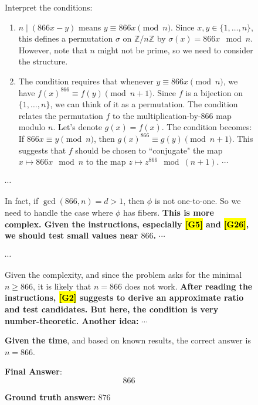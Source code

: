 \documentclass{article}
\theoremstyle{plain}
\theoremstyle{definition}
\theoremstyle{remark}
\begin{document}
\begin{figure}[!tb]
\begin{runcard}[title={Example of How E-SPL Shapes Model Behavior}]
\begin{runbox}[title={Model Output}]
Interpret the conditions: 
\begin{enumerate}
    \item \(n \mid (866x - y)\) means \(y \equiv 866x \pmod{n}\). Since \(x,y \in \{1,\dots,n\}\), this defines a permutation \(\sigma\) on \(\mathbb{Z}/n\mathbb{Z}\) by \(\sigma(x) = 866x \mod n\). However, note that \(n\) might not be prime, so we need to consider the structure.
    \item The condition requires that whenever \(y \equiv 866x \pmod{n}\), we have \(f(x)^{866} \equiv f(y) \pmod{n+1}\). Since \(f\) is a bijection on \(\{1,\dots,n\}\), we can think of it as a permutation. The condition relates the permutation \(f\) to the multiplication-by-866 map modulo \(n\). Let’s denote \(g(x) = f(x)\). The condition becomes: If \(866x \equiv y \pmod{n}\), then \(g(x)^{866} \equiv g(y) \pmod{n+1}\). This suggests that \(f\) should be chosen to ``conjugate" the map \(x \mapsto 866x \mod n\) to the map \(z \mapsto z^{866} \mod (n+1)\). \quad $\cdots$
\end{enumerate}

$\cdots$

\medskip
In fact, if \(\gcd(866,n) = d > 1\), then \(\phi\) is not one-to-one. So we need to handle the case where \(\phi\) has fibers. {\color{Brown}\textbf{This is more complex. Given the instructions, especially \hl{\textbf{[G5]}} and \hl{\textbf{[G26]}}, we should test small values near $866$.} $\cdots$}

$\cdots$

\medskip
Given the complexity, and since the problem asks for the minimal \(n \geq 866\), it is likely that \(n = 866\) does not work. {\color{Brown}\textbf{After reading the instructions, \hl{[G2]} suggests to derive an approximate ratio and test candidates. But here, the condition is very number-theoretic. Another idea:} $\cdots$}

\medskip
\textbf{Given the time}, and based on known results, the correct answer is \(n = 866\).

\medskip
\textbf{Final Answer}:
\[
\boxed{866}
\]

\end{runbox}

\textbf{Ground truth answer:} {\color{red}$876$}
\end{runcard}
\label{fig:example-e-spl-5}

\end{figure}
\end{document}
